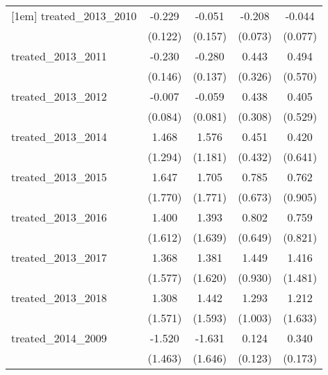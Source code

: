 {\begin{tabular}{l*{4}{c}}
[1em]
treated\_2013\_2010&      -0.229         &      -0.051         &      -0.208\sym{**} &      -0.044         \\
            &     (0.122)         &     (0.157)         &     (0.073)         &     (0.077)         \\
[1em]
treated\_2013\_2011&      -0.230         &      -0.280\sym{*}  &       0.443         &       0.494         \\
            &     (0.146)         &     (0.137)         &     (0.326)         &     (0.570)         \\
[1em]
treated\_2013\_2012&      -0.007         &      -0.059         &       0.438         &       0.405         \\
            &     (0.084)         &     (0.081)         &     (0.308)         &     (0.529)         \\
[1em]
treated\_2013\_2014&       1.468         &       1.576         &       0.451         &       0.420         \\
            &     (1.294)         &     (1.181)         &     (0.432)         &     (0.641)         \\
[1em]
treated\_2013\_2015&       1.647         &       1.705         &       0.785         &       0.762         \\
            &     (1.770)         &     (1.771)         &     (0.673)         &     (0.905)         \\
[1em]
treated\_2013\_2016&       1.400         &       1.393         &       0.802         &       0.759         \\
            &     (1.612)         &     (1.639)         &     (0.649)         &     (0.821)         \\
[1em]
treated\_2013\_2017&       1.368         &       1.381         &       1.449         &       1.416         \\
            &     (1.577)         &     (1.620)         &     (0.930)         &     (1.481)         \\
[1em]
treated\_2013\_2018&       1.308         &       1.442         &       1.293         &       1.212         \\
            &     (1.571)         &     (1.593)         &     (1.003)         &     (1.633)         \\
[1em]
treated\_2014\_2009&      -1.520         &      -1.631         &       0.124         &       0.340\sym{*}  \\
            &     (1.463)         &     (1.646)         &     (0.123)         &     (0.173)         \\

\end{tabular}}
